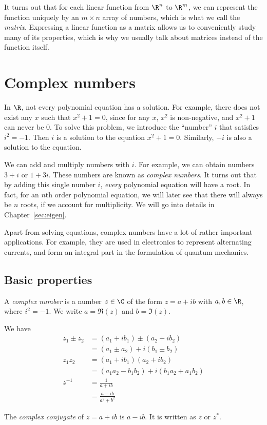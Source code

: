 \documentclass[a4paper]{article}
\begin{document}
It turns out that for each linear function from $\R^n$ to $\R^m$, we can represent the function uniquely by an $m\times n$ array of numbers, which is what we call the \emph{matrix}. Expressing a linear function as a matrix allows us to conveniently study many of its properties, which is why we usually talk about matrices instead of the function itself.

\section{Complex numbers}
In $\R$, not every polynomial equation has a solution. For example, there does not exist any $x$ such that $x^2 + 1 = 0$, since for any $x$, $x^2$ is non-negative, and $x^2 + 1$ can never be $0$. To solve this problem, we introduce the ``number'' $i$ that satisfies $i^2 = -1$. Then $i$ is a solution to the equation $x^2 + 1 = 0$. Similarly, $-i$ is also a solution to the equation.

We can add and multiply numbers with $i$. For example, we can obtain numbers $3 + i$ or $1 + 3i$. These numbers are known as \emph{complex numbers}. It turns out that by adding this single number $i$, \emph{every} polynomial equation will have a root. In fact, for an $n$th order polynomial equation, we will later see that there will always be $n$ roots, if we account for multiplicity. We will go into details in Chapter~\ref{sec:eigen}.

Apart from solving equations, complex numbers have a lot of rather important applications. For example, they are used in electronics to represent alternating currents, and form an integral part in the formulation of quantum mechanics.

\subsection{Basic properties}
\begin{defi}
  A \emph{complex number} is a number $z\in \C$ of the form $z = a + ib$ with $a, b\in \R$, where $i^2=-1$. We write $a = \Re(z)$ and $b = \Im(z)$.
\end{defi}

We have
\begin{align*}
  z_1\pm z_2 &= (a_1 + ib_1)\pm (a_2 + ib_2)\\
  &= (a_1\pm a_2) + i(b_1 \pm b_2)\\
  z_1z_2 &= (a_1 + ib_1)(a_2 + ib_2)\\
  &= (a_1a_2 - b_1b_2) + i(b_1a_2 + a_1b_2)\\
  z^{-1} &= \frac{1}{a + ib}\\
  &= \frac{a - ib}{a^2 + b^2}
\end{align*}
\begin{defi}
  The \emph{complex conjugate} of $z = a+ ib$ is $a - ib$. It is written as $\bar{z}$ or $z^*$.
\end{defi}
\end{document}

